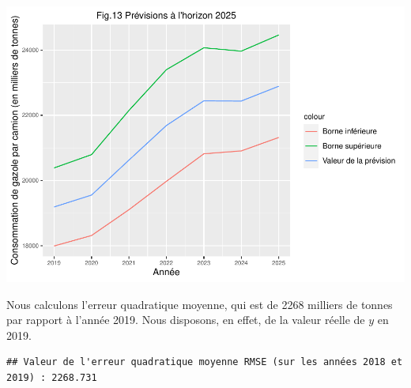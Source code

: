 \documentclass[
]{article}
\begin{document}
\includegraphics{Projet_econometrie_II_files/figure-latex/unnamed-chunk-20-1.pdf}

Nous calculons l'erreur quadratique moyenne, qui est de 2268 milliers de
tonnes par rapport à l'année 2019. Nous disposons, en effet, de la
valeur réelle de \(y\) en 2019.

\begin{verbatim}
## Valeur de l'erreur quadratique moyenne RMSE (sur les années 2018 et 2019) : 2268.731
\end{verbatim}

\printbibliography[title=Bibliographie]
\end{document}
